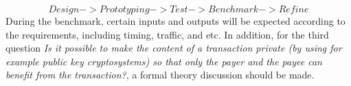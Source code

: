$$Design -> Prototyping -> Test -> Benchmark -> Refine$$
\newline
During the benchmark, certain inputs and outputs will be expected according to the requirements, 
including timing, traffic, and etc.
\newline
\newline
In addition, for the third question \textit{Is it possible to make the content of a transaction private (by using for example public key cryptosystems) so that only the payer and the payee can benefit from the transaction?},
a formal theory discussion should be made. 







